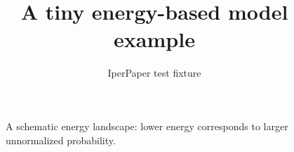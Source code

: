 \documentclass{article}
\title{A tiny energy-based model example}
\author{IperPaper test fixture}
\DeclareRobustCommand{\iperpaper}[2]{%
  \begingroup
  \hypersetup{pdfborder=0 0 0}%
  \href{iperpaper:#1}{{\color{iperpaperlink}#2}}%
  \endgroup
}
\def\iperpaper#1#2{#2}%
\begin{document}
\maketitle



\begin{figure}[h]
\centering
\fbox{\rule{0pt}{28mm}\rule{0.72\linewidth}{0pt}}
\caption{A schematic \iperpaper{energy_landscape}{energy landscape}: lower energy corresponds to larger unnormalized probability.}
\end{figure}
\end{document}
